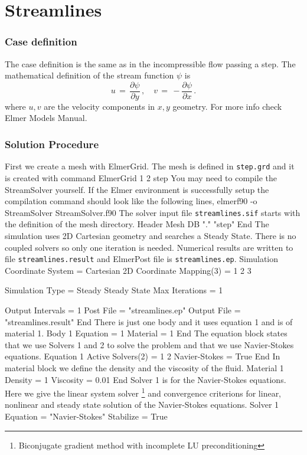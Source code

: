 \chapter{Streamlines}


\subsection*{Case definition}
The case definition is the same as in the incompressible flow passing a step.
The mathematical definition of the stream function $\psi$ is
\begin{equation}
u \, = \, \frac{\partial \psi}{\partial y} \, , \quad
v \, = \, - \frac{\partial \psi}{\partial x} \,.
\end{equation}
where $u,v$ are the velocity components in $x,y$ geometry.
For more info check Elmer Models Manual.

\subsection*{Solution Procedure}
First we create a mesh with ElmerGrid. The mesh is defined in
{\tt step.grd} and it is created with command
\ttbegin
ElmerGrid 1 2 step
\ttend
You may need to compile the StreamSolver yourself. If the Elmer environment is 
successfully setup the compilation command should look like
the following lines, 
\ttbegin
elmerf90 -o StreamSolver StreamSolver.f90
\ttend
The solver input file {\tt streamlines.sif} starts with 
the definition of the mesh directory. 
\ttbegin
Header
  Mesh DB "." "step"
End
\ttend
The simulation uses 2D Cartesian geometry and searches a Steady State.
There is no coupled solvers so only one iteration is needed. 
Numerical results are written to file {\tt streamlines.result}
and ElmerPost file is {\tt streamlines.ep}.
\ttbegin
Simulation
  Coordinate System =  Cartesian 2D
  Coordinate Mapping(3) = 1 2 3

  Simulation Type = Steady
  Steady State Max Iterations = 1

  Output Intervals = 1
  Post File = "streamlines.ep"
  Output File = "streamlines.result"
End
\ttend
There is just one body and it uses equation 1 and
is of material 1.
\ttbegin
Body 1
  Equation = 1
  Material = 1
End
\ttend
The equation block states that we use Solvers 1 and 2 to solve the problem
and that we use Navier-Stokes equations.
\ttbegin
Equation 1
  Active Solvers(2) = 1 2
  Navier-Stokes = True
End
\ttend
In material block we define the density and the viscosity of the fluid.
\ttbegin
Material 1
  Density = 1
  Viscosity = 0.01
End
\ttend
Solver 1 is for the Navier-Stokes equations.
Here we give the linear system solver
\footnote{Biconjugate gradient method with incomplete LU preconditioning}
and convergence criterions for linear, nonlinear and steady state 
solution of the Navier-Stokes equations.
\ttbegin
Solver 1
  Equation = "Navier-Stokes"
  Stabilize = True

